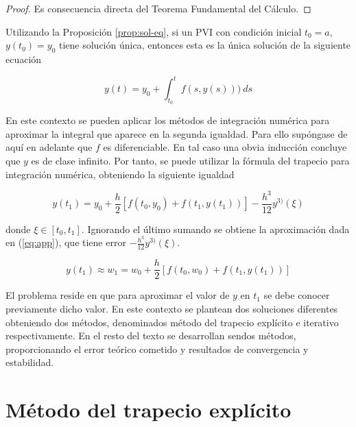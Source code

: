 \documentclass{article}
\theoremstyle{theorem-style}  %
\theoremstyle{definition-style}
\theoremstyle{example-style}
\begin{document}
	\begin{proof}
		Es consecuencia directa del Teorema Fundamental del Cálculo.
	\end{proof}

	
	Utilizando la Proposición \ref{prop:sol-eq}, si un PVI con condición inicial $t_0 = a$, $y(t_0) = y_0$ tiene solución única, entonces esta es la única solución de la siguiente ecuación
	
	\begin{equation}
		y(t)  = y_0 + \int_{t_0}^{t} f(s,y(s))) \ ds
	\end{equation}
	
	En este contexto se pueden aplicar los métodos de integración numérica para aproximar la integral que aparece en la segunda igualdad. Para ello supóngase de aquí en adelante que $f$ es diferenciable. En tal caso una obvia inducción concluye que $y$ es de clase infinito. Por tanto, se puede utilizar la fórmula del trapecio para integración numérica, obteniendo la siguiente igualdad
	
	\begin{equation} \label{eq:trapecio-igualdad}
		y(t_{1}) = y_0 + \frac{h}{2} \left[f(t_0,y_0) + f(t_1, y(t_1))\right] - \frac{h^3}{12}y^{3)}(\xi)
	\end{equation}


	donde $\xi \in [t_0, t_1]$. Ignorando el último sumando se obtiene la aproximación dada en (\ref{eq:app}), que tiene error $- \frac{h^3}{12}y^{3)}(\xi)$.

	\begin{equation} \label{eq:app}
		y(t_1) \approx w_1 = w_0 + \frac{h}{2} \left[f(t_0,w_0) + f(t_1, y(t_1))\right]
	\end{equation}

	El problema reside en que para aproximar el valor de $y$ en $t_1$ se debe conocer previamente dicho valor. En este contexto se plantean dos soluciones diferentes obteniendo dos métodos, denominados método del trapecio explícito e iterativo respectivamente. En el resto del texto se desarrollan sendos métodos, proporcionando el error teórico cometido y resultados de convergencia y estabilidad.
	

\section{Método del trapecio explícito}	 \label{sec:trapecio-explicito}
		
\end{document}
